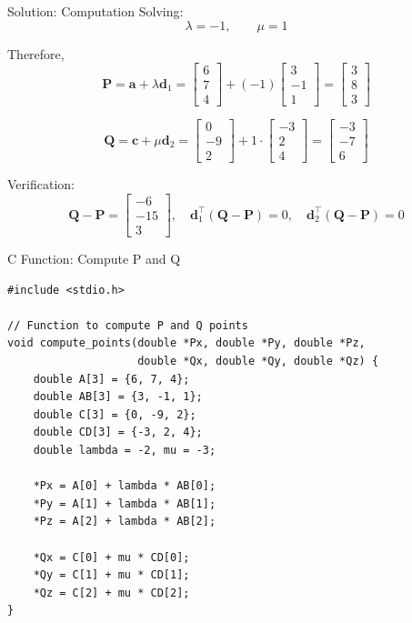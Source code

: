 \documentclass{beamer}
\renewcommand{\vec}[1]{\mathbf{#1}}
\begin{document}
\begin{frame}{Solution: Computation}
\small
Solving:
\[
\lambda=-1,\qquad \mu=1
\]

Therefore,
\[
\vec{P}=\vec{a}+\lambda\vec{d}_1
=\begin{bmatrix}6\\7\\4\end{bmatrix}+\left(-1\right)\begin{bmatrix}3\\-1\\1\end{bmatrix}
=\begin{bmatrix}3\\8\\3\end{bmatrix}
\]

\[
\vec{Q}=\vec{c}+\mu\vec{d}_2
=\begin{bmatrix}0\\-9\\2\end{bmatrix}+1\cdot\begin{bmatrix}-3\\2\\4\end{bmatrix}
=\begin{bmatrix}-3\\-7\\6\end{bmatrix}
\]

Verification:
\[
\vec{Q}-\vec{P}=\begin{bmatrix}-6\\-15\\3\end{bmatrix}, \quad
\vec{d}_1^{\top}(\vec{Q}-\vec{P})=0,\quad
\vec{d}_2^{\top}(\vec{Q}-\vec{P})=0
\]
\end{frame}

\begin{frame}[fragile]{C Function: Compute P and Q}
\begin{lstlisting}
#include <stdio.h>

// Function to compute P and Q points
void compute_points(double *Px, double *Py, double *Pz,
                    double *Qx, double *Qy, double *Qz) {
    double A[3] = {6, 7, 4};
    double AB[3] = {3, -1, 1};
    double C[3] = {0, -9, 2};
    double CD[3] = {-3, 2, 4};
    double lambda = -2, mu = -3;

    *Px = A[0] + lambda * AB[0];
    *Py = A[1] + lambda * AB[1];
    *Pz = A[2] + lambda * AB[2];

    *Qx = C[0] + mu * CD[0];
    *Qy = C[1] + mu * CD[1];
    *Qz = C[2] + mu * CD[2];
}
\end{lstlisting}

\end{frame}
\end{document}
